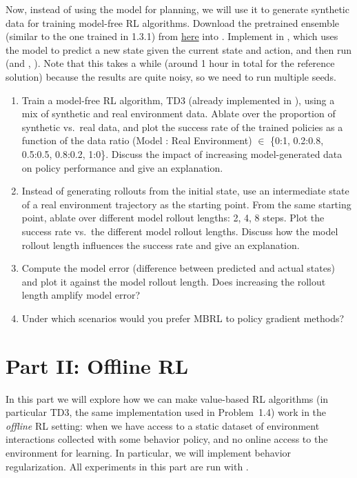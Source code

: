 \documentclass[11pt]{article}
\begin{document}
Now, instead of using the model for planning, we will use it to generate synthetic data for training model-free RL algorithms. Download the pretrained ensemble  (similar to the one trained in 1.3.1) from \href{\modelurl}{here} into . Implement  in , which uses the model to predict a new state given the current state and action, and then run  (and , ). Note that this takes a while (around 1 hour in total for the reference solution) because the results are quite noisy, so we need to run multiple seeds.
\begin{enumerate}
  \item {} Train a model-free RL algorithm, TD3 (already implemented in ), using a mix of synthetic and real environment data. Ablate over the proportion of synthetic vs.\ real data, and plot the success rate of the trained policies as a function of the data ratio (Model : Real Environment) $\in$ \{0:1, 0.2:0.8, 0.5:0.5, 0.8:0.2, 1:0\}. Discuss the impact of increasing model-generated data on policy performance and give an explanation.
  \item {} Instead of generating rollouts from the initial state, use an intermediate state of a real environment trajectory as the starting point. From the same starting point, ablate over different model rollout lengths: 2, 4, 8 steps. Plot the success rate vs.\ the different model rollout lengths. Discuss how the model rollout length influences the success rate and give an explanation.
  \item {} Compute the model error (difference between predicted and actual states) and plot it against the model rollout length. Does increasing the rollout length amplify model error?
  \item {} Under which scenarios would you prefer MBRL to policy gradient methods?
\end{enumerate}

\part*{Part II: Offline RL}
In this part we will explore how we can make value-based RL algorithms (in particular TD3, the same implementation used in Problem~1.4) work in the \emph{offline} RL setting: when we have access to a static dataset of environment interactions collected with some behavior policy, and no online access to the environment for learning. In particular, we will implement behavior regularization. All experiments in this part are run with .
\end{document}
